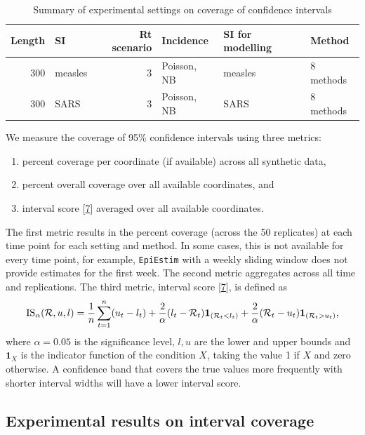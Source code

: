 \documentclass[
]{article}
\providecommand{\tightlist}{%
  \setlength{\itemsep}{0pt}\setlength{\parskip}{0pt}}
\begin{document}
\begin{table}
\centering
\caption{\label{tab:df-ci-exp}Summary of experimental settings on coverage of confidence intervals}
\centering
\begin{tabular}[t]{rlrlll}
\toprule
Length & SI & Rt scenario & Incidence & SI for modelling & Method\\
\midrule
300 & measles & 3 & Poisson, NB & measles & 8 methods\\
300 & SARS & 3 & Poisson, NB & SARS & 8 methods\\
\bottomrule
\end{tabular}
\end{table}

We measure the coverage of 95\% confidence intervals using three metrics:

\begin{enumerate}
\def\labelenumi{\arabic{enumi}.}
\tightlist
\item
  percent coverage per coordinate (if available) across all synthetic data,
\item
  percent overall coverage over all available coordinates, and
\item
  interval score {[}\protect\hyperlink{ref-Bracher_2021}{7}{]} averaged over all available coordinates.
\end{enumerate}

The first metric results in the percent coverage (across the 50 replicates)
at each time point for each setting and method. In some cases, this is not available
for every time point, for example, \texttt{EpiEstim} with a weekly sliding window
does not provide estimates for the first week. The second metric aggregates across
all time and replications.
The third metric, interval score {[}\protect\hyperlink{ref-Bracher_2021}{7}{]}, is defined as
\[\textrm{IS}_{\alpha}(\mathcal{R},u,l) = \frac{1}{n} \sum_{t=1}^n (u_t-l_t) + \frac{2}{\alpha}(l_t-\mathcal{R}_t)\boldsymbol{1}_{(\mathcal{R}_t<l_t)} + \frac{2}{\alpha}(\mathcal{R}_t-u_t)\boldsymbol{1}_{(\mathcal{R}_t>u_t)},\]
where \(\alpha=0.05\) is the significance level, \(l,u\) are the lower and upper
bounds and
\(\mathbf{1}_{X}\) is the indicator function of the condition \(X\), taking the value 1 if \(X\) and zero otherwise.
A confidence band that covers the true values more frequently with shorter
interval widths will have a lower interval score.

\clearpage

\hypertarget{experimental-results-on-interval-coverage}{%
\subsection{Experimental results on interval coverage}\label{experimental-results-on-interval-coverage}}
\end{document}
